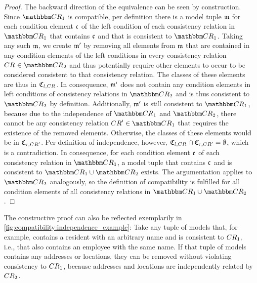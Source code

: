 \begin{proof}
    The backward direction of the equivalence can be seen by construction.
    Since $\consistencyrelationset{CR}_{1}$ is compatible, per definition there is a model tuple $\modeltuple{m}$ for each condition element $\conditionelement{c}{}$ of the left condition of each consistency relation in $\consistencyrelationset{CR}_{1}$ that contains $\conditionelement{c}{}$ and that is consistent to $\consistencyrelationset{CR}_{1}$.
    Taking any such $\modeltuple{m}$, we create $\modeltuple{m'}$ by removing all elements from $\modeltuple{m}$ that are contained in any condition elements of the left conditions in every consistency relation $\consistencyrelation{CR}{} \in \consistencyrelationset{CR}_{2}$ and thus potentially require other elements to occur to be considered consistent to that consistency relation.
    The classes of these elements are thus in $\classtuple{C}{l,\consistencyrelation{CR}{}}$.
    In consequence, $\modeltuple{m'}$ does not contain any condition elements in left conditions of consistency relations in $\consistencyrelationset{CR}_{2}$ and is thus consistent to $\consistencyrelationset{CR}_{2}$ by definition. 
    Additionally, $\modeltuple{m'}$ is still consistent to $\consistencyrelationset{CR}_{1}$, because due to the independence of $\consistencyrelationset{CR}_{1}$ and $\consistencyrelationset{CR}_{2}$, there cannot be any consistency relation $\consistencyrelation{CR}{}' \in \consistencyrelationset{CR}_{1}$ that requires the existence of the removed elements.
    Otherwise, the classes of these elements would be in $\classtuple{C}{r,\consistencyrelation{CR}{}'}$.
    Per definition of independence, however, $\classtuple{C}{l,\consistencyrelation{CR}{}} \cap \classtuple{C}{r,\consistencyrelation{CR}{}'} = \emptyset$, which is a contradiction.
    In consequence, for each condition element $\conditionelement{c}{}$ of each consistency relation in $\consistencyrelationset{CR}_{1}$, a model tuple that contains $\conditionelement{c}{}$ and is consistent to $\consistencyrelationset{CR}_{1} \cup \consistencyrelationset{CR}_{2}$ exists.
    The argumentation applies to $\consistencyrelationset{CR}_{2}$ analogously, so the definition of compatibility is fulfilled for all condition elements of all consistency relations in $\consistencyrelationset{CR}_{1} \cup \consistencyrelationset{CR}_{2}$.
\end{proof}

The constructive proof can also be reflected exemplarily in \autoref{fig:compatibility:independence_example}: Take any tuple of models that, for example, contains a resident with an arbitrary name and is consistent to $\consistencyrelation{CR}{1}$, i.e., that also contains an employee with the same name.
If that tuple of models contains any addresses or locations, they can be removed without violating consistency to $\consistencyrelation{CR}{1}$, because addresses and locations are independently related by $\consistencyrelation{CR}{2}$.


